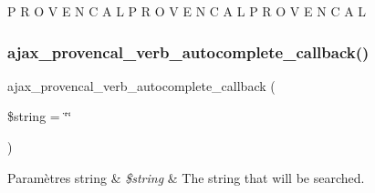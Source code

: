 P R O V E N C A L P R O V E N C A L P R O V E N C A L \hypertarget{conjoc__provencal__webForm_8inc_a2f2da1c5cc327e80252b73dd250aa363}{}\label{conjoc__provencal__webForm_8inc_a2f2da1c5cc327e80252b73dd250aa363} 
\subsubsection{\texorpdfstring{ajax\+\_\+provencal\+\_\+verb\+\_\+autocomplete\+\_\+callback()}{ajax\_provencal\_verb\_autocomplete\_callback()}}
{\footnotesize\ttfamily ajax\+\_\+provencal\+\_\+verb\+\_\+autocomplete\+\_\+callback (\begin{DoxyParamCaption}\item[{}]{\$string = {\ttfamily \char`\"{}\char`\"{}} }\end{DoxyParamCaption})}


\begin{DoxyParams}[1]{Paramètres}
string & {\em \$string} & The string that will be searched. \\
\hline
\end{DoxyParams}
